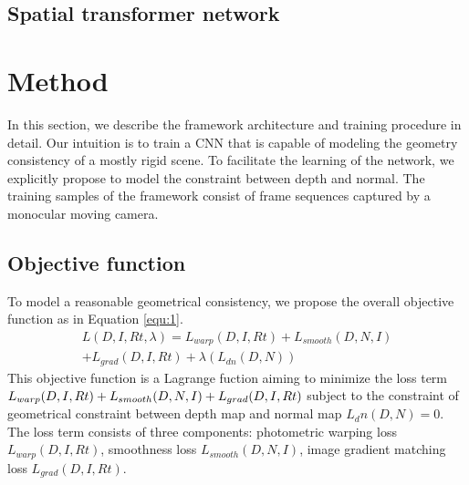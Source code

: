 \documentclass[letterpaper]{article} %
\begin{document}
\subsection{Spatial transformer network}


\section{Method}
In this section, we describe the framework architecture and training procedure in detail.
Our intuition is to train a CNN that is capable of modeling the geometry consistency of a mostly rigid scene. To facilitate the learning of the network, we explicitly propose to model the constraint between depth and normal. The training samples of the framework consist of frame sequences captured by a monocular moving camera.
  
\subsection{Objective function}
To model a reasonable geometrical consistency, we propose the overall objective function as in Equation \ref{equ:1}.
\begin{equation}
\label{equ:1}
\begin{split}
L(D, I, Rt, \lambda) = L_{warp}(D, I, Rt) + L_{smooth}(D, N, I) \\
 +  L_{grad}(D, I, Rt) + \lambda(L_{dn}(D, N))
\end{split}
\end{equation}
This objective function is a Lagrange fuction aiming to minimize the loss term $L_{warp}(D, I, Rt) + L_{smooth}(D, N, I) \\
 +  L_{grad}(D, I, Rt)$ subject to the constraint of geometrical constraint between depth map and normal map $L_dn(D, N) = 0$. The loss term consists of three components: photometric warping loss $L_{warp}(D, I, Rt)$, smoothness loss $L_{smooth}(D, N, I)$, image gradient matching loss $L_{grad}(D, I, Rt)$.
 
\end{document}
